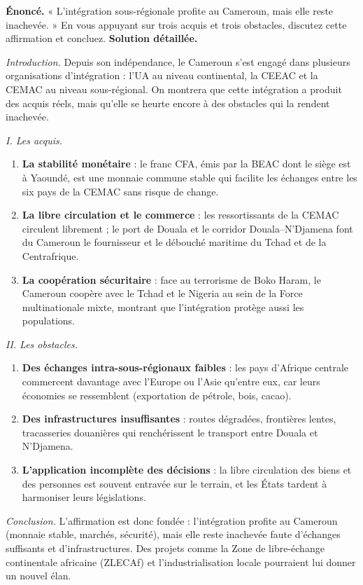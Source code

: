 \documentclass[11pt]{article}
\begin{document}
\begin{exoresolu}
\textbf{Énoncé.} « L'intégration sous-régionale profite au Cameroun, mais elle reste inachevée. » En vous appuyant sur trois acquis et trois obstacles, discutez cette affirmation et concluez.
\tcblower
\textbf{Solution détaillée.}

\emph{Introduction.} Depuis son indépendance, le Cameroun s'est engagé dans plusieurs organisations d'intégration : l'UA au niveau continental, la CEEAC et la CEMAC au niveau sous-régional. On montrera que cette intégration a produit des acquis réels, mais qu'elle se heurte encore à des obstacles qui la rendent inachevée.

\emph{I. Les acquis.}
\begin{enumerate}
\item \textbf{La stabilité monétaire} : le franc CFA, émis par la BEAC dont le siège est à Yaoundé, est une monnaie commune stable qui facilite les échanges entre les six pays de la CEMAC sans risque de change.
\item \textbf{La libre circulation et le commerce} : les ressortissants de la CEMAC circulent librement ; le port de Douala et le corridor Douala--N'Djamena font du Cameroun le fournisseur et le débouché maritime du Tchad et de la Centrafrique.
\item \textbf{La coopération sécuritaire} : face au terrorisme de Boko Haram, le Cameroun coopère avec le Tchad et le Nigeria au sein de la Force multinationale mixte, montrant que l'intégration protège aussi les populations.
\end{enumerate}

\emph{II. Les obstacles.}
\begin{enumerate}
\item \textbf{Des échanges intra-sous-régionaux faibles} : les pays d'Afrique centrale commercent davantage avec l'Europe ou l'Asie qu'entre eux, car leurs économies se ressemblent (exportation de pétrole, bois, cacao).
\item \textbf{Des infrastructures insuffisantes} : routes dégradées, frontières lentes, tracasseries douanières qui renchérissent le transport entre Douala et N'Djamena.
\item \textbf{L'application incomplète des décisions} : la libre circulation des biens et des personnes est souvent entravée sur le terrain, et les États tardent à harmoniser leurs législations.
\end{enumerate}

\emph{Conclusion.} L'affirmation est donc fondée : l'intégration profite au Cameroun (monnaie stable, marchés, sécurité), mais elle reste inachevée faute d'échanges suffisants et d'infrastructures. Des projets comme la Zone de libre-échange continentale africaine (ZLECAf) et l'industrialisation locale pourraient lui donner un nouvel élan.
\end{exoresolu}
\end{document}
